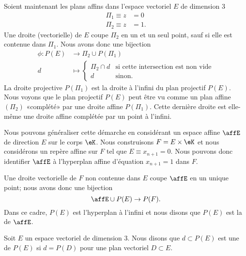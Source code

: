 Soient maintenant les plans affins dans l'espace vectoriel \( E\) de dimension \( 3\)
\begin{subequations}
    \begin{align}
        \Pi_1\equiv z&=0\\
        \Pi_2\equiv z&=1.
    \end{align}
\end{subequations}
Une droite (vectorielle) de \( E\) coupe \( \Pi_2\) en un et un seul point, sauf si elle est contenue dans \( \Pi_1\). Nous avons donc une bijection
\begin{equation}
    \begin{aligned}
        \phi\colon P(E)&\to \Pi_2\cup P(\Pi_1) \\
        d&\mapsto \begin{cases}
            \Pi_2\cap d    &   \text{si cette intersection est non vide}\\
            d    &    \text{sinon.}
        \end{cases}
    \end{aligned}
\end{equation}
La droite projective \( P(\Pi_1)\) est la droite à l'infini du plan projectif \( P(E)\). Nous voyons que le plan projectif \( P(E)\) peut être vu comme un plan affine \( (\Pi_2)\) «complété»  par une droite affine \( P(\Pi_1)\). Cette dernière droite est elle-même une droite affine complétée par un point à l'infini.

Nous pouvons généraliser cette démarche en considérant un espace affine \( \affE\) de direction \( E\) sur le corps \( \eK\). Nous construisons \( F=E\times \eK\) et nous considérons un repère affine sur \( F\) tel que \( E\equiv x_{n+1}=0\). Nous pouvons donc identifier \( \affE\) à l'hyperplan affine d'équation \( x_{n+1}=1\) dans \( F\).

Une droite vectorielle de \( F\) non contenue dans \( E\) coupe \( \affE\) en un unique point; nous avons donc une bijection
\begin{equation}
    \affE\cup P(E)\to P(F).
\end{equation}
Dans ce cadre, \( P(E)\) est l'hyperplan à l'infini et nous disons que \( P(E)\) est la  de \( \affE\).

\begin{definition}
    Soit \( E\) un espace vectoriel de dimension \( 3\). Nous disons que \( d\subset P(E)\) est une  de \( P(E)\) si \( d=P(D)\) pour une plan vectoriel \( D\subset E\).
\end{definition}

